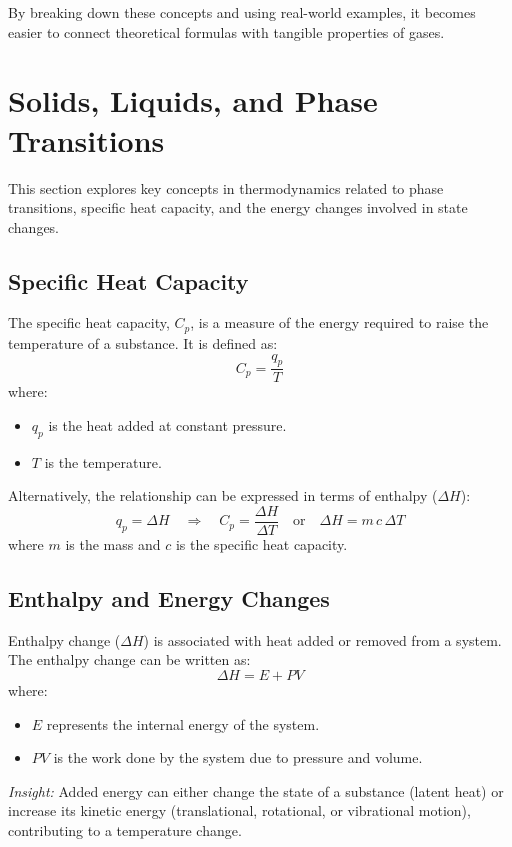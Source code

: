 \documentclass{report}
\begin{document}
By breaking down these concepts and using real-world examples, it becomes easier to connect theoretical formulas with tangible properties of gases.

\section{Solids, Liquids, and Phase Transitions}

This section explores key concepts in thermodynamics related to phase transitions, specific heat capacity, and the energy changes involved in state changes.

\subsection{Specific Heat Capacity}
The specific heat capacity, \( C_p \), is a measure of the energy required to raise the temperature of a substance. It is defined as:
\[
C_p = \frac{q_p}{T}
\]
where:
\begin{itemize}
    \item \( q_p \) is the heat added at constant pressure.
    \item \( T \) is the temperature.
\end{itemize}

Alternatively, the relationship can be expressed in terms of enthalpy (\( \Delta H \)):
\[
q_p = \Delta H \quad \Rightarrow \quad C_p = \frac{\Delta H}{\Delta T} \quad \text{or} \quad \Delta H = m \, c \, \Delta T
\]
where \( m \) is the mass and \( c \) is the specific heat capacity.

\subsection{Enthalpy and Energy Changes}
Enthalpy change (\( \Delta H \)) is associated with heat added or removed from a system. The enthalpy change can be written as:
\[
\Delta H = E + PV
\]
where:
\begin{itemize}
    \item \( E \) represents the internal energy of the system.
    \item \( PV \) is the work done by the system due to pressure and volume.
\end{itemize}

\begin{center}
    \textit{Insight:} Added energy can either change the state of a substance (latent heat) or increase its kinetic energy (translational, rotational, or vibrational motion), contributing to a temperature change.
\end{center}
\end{document}

